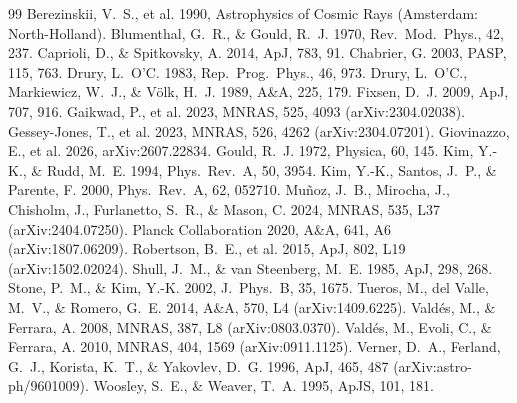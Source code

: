 \documentclass[11pt,a4paper]{article}
\begin{document}
\begin{thebibliography}{99}
 Berezinskii, V.~S., et al. 1990, Astrophysics of Cosmic Rays (Amsterdam: North-Holland).
 Blumenthal, G.~R., \& Gould, R.~J. 1970, Rev.\ Mod.\ Phys., 42, 237.
 Caprioli, D., \& Spitkovsky, A. 2014, ApJ, 783, 91.
 Chabrier, G. 2003, PASP, 115, 763.
 Drury, L.~O'C. 1983, Rep.\ Prog.\ Phys., 46, 973.
 Drury, L.~O'C., Markiewicz, W.~J., \& V\"olk, H.~J. 1989, A\&A, 225, 179.
 Fixsen, D.~J. 2009, ApJ, 707, 916.
 Gaikwad, P., et al. 2023, MNRAS, 525, 4093 (arXiv:2304.02038).
 Gessey-Jones, T., et al. 2023, MNRAS, 526, 4262 (arXiv:2304.07201).
 Giovinazzo, E., et al. 2026, arXiv:2607.22834.
 Gould, R.~J. 1972, Physica, 60, 145.
 Kim, Y.-K., \& Rudd, M.~E. 1994, Phys.\ Rev.\ A, 50, 3954.
 Kim, Y.-K., Santos, J.~P., \& Parente, F. 2000, Phys.\ Rev.\ A, 62, 052710.
 Mu\~noz, J.~B., Mirocha, J., Chisholm, J., Furlanetto, S.~R., \& Mason, C. 2024, MNRAS, 535, L37 (arXiv:2404.07250).
 Planck Collaboration 2020, A\&A, 641, A6 (arXiv:1807.06209).
 Robertson, B.~E., et al. 2015, ApJ, 802, L19 (arXiv:1502.02024).
 Shull, J.~M., \& van Steenberg, M.~E. 1985, ApJ, 298, 268.
 Stone, P.~M., \& Kim, Y.-K. 2002, J.\ Phys.\ B, 35, 1675.
 Tueros, M., del Valle, M.~V., \& Romero, G.~E. 2014, A\&A, 570, L4 (arXiv:1409.6225).
 Vald\'es, M., \& Ferrara, A. 2008, MNRAS, 387, L8 (arXiv:0803.0370).
 Vald\'es, M., Evoli, C., \& Ferrara, A. 2010, MNRAS, 404, 1569 (arXiv:0911.1125).
 Verner, D.~A., Ferland, G.~J., Korista, K.~T., \& Yakovlev, D.~G. 1996, ApJ, 465, 487 (arXiv:astro-ph/9601009).
 Woosley, S.~E., \& Weaver, T.~A. 1995, ApJS, 101, 181.
\end{thebibliography}
\end{document}
